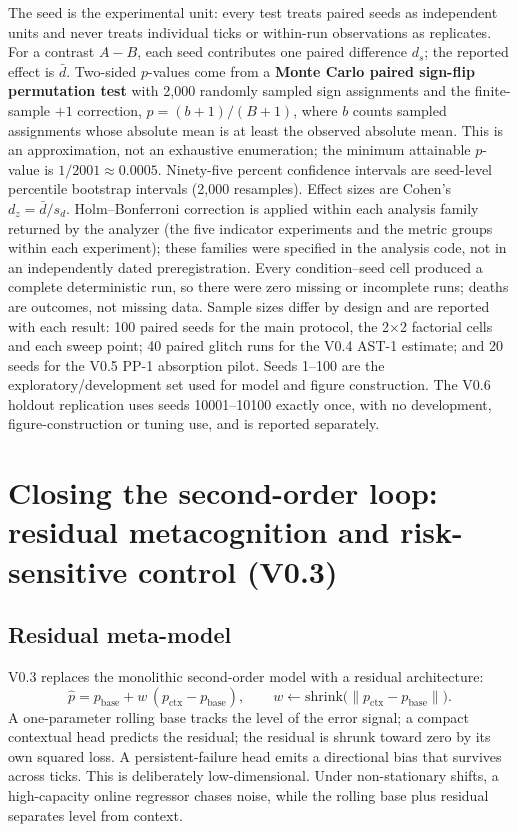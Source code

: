 \documentclass{article}
\begin{document}
The seed is the experimental unit: every test treats paired seeds as independent units and never treats
individual ticks or within-run observations as replicates. For a contrast $A-B$, each seed contributes
one paired difference $d_s$; the reported effect is $\bar d$. Two-sided $p$-values come from a
\textbf{Monte Carlo paired sign-flip permutation test} with 2{,}000 randomly sampled sign assignments
and the finite-sample $+1$ correction, $p=(b+1)/(B+1)$, where $b$ counts sampled assignments whose
absolute mean is at least the observed absolute mean. This is an approximation, not an exhaustive
enumeration; the minimum attainable $p$-value is $1/2001\approx0.0005$. Ninety-five percent confidence
intervals are seed-level percentile bootstrap intervals (2{,}000 resamples). Effect sizes are Cohen's
$d_z=\bar d/s_d$. Holm--Bonferroni correction is applied within each analysis family returned by the
analyzer (the five indicator experiments and the metric groups within each experiment); these families
were specified in the analysis code, not in an independently dated preregistration. Every
condition--seed cell produced a complete deterministic run, so there were zero missing or incomplete
runs; deaths are outcomes, not missing data. Sample sizes differ by design and are reported with each
result: 100 paired seeds for the main protocol, the 2$\times$2 factorial cells and each sweep point;
40 paired glitch runs for the V0.4 AST-1 estimate; and 20 seeds for the V0.5 PP-1 absorption pilot.
Seeds 1--100 are the exploratory/development set used for model and figure construction. The V0.6
holdout replication uses seeds 10001--10100 exactly once, with no development, figure-construction or
tuning use, and is reported separately.

\section{Closing the second-order loop: residual metacognition and risk-sensitive control (V0.3)}

\subsection{Residual meta-model}

V0.3 replaces the monolithic second-order model with a residual architecture:
\begin{equation}
\hat{p} = p_{\mathrm{base}} + w\,(p_{\mathrm{ctx}} - p_{\mathrm{base}}),
\qquad
w \leftarrow \mathrm{shrink}\bigl(\lVert p_{\mathrm{ctx}} - p_{\mathrm{base}}\rVert\bigr).
\end{equation}
A one-parameter rolling base tracks the level of the error signal; a compact contextual head predicts the residual; the residual is shrunk toward zero by its own squared loss. A persistent-failure head emits a directional bias that survives across ticks. This is deliberately low-dimensional. Under non-stationary shifts, a high-capacity online regressor chases noise, while the rolling base plus residual separates level from context.
\end{document}
